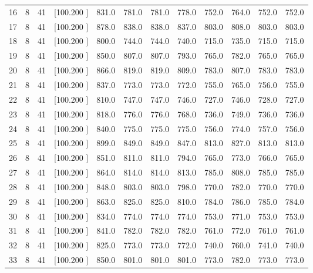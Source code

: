 \documentclass[12pt,a4paper]{article}
\begin{document}
\begin{center}
{\begin{tabular}{r r r r r r r r r r r r}
  16&  8& 41&[100.200   ]&   831.0&   781.0&   781.0&   778.0&   752.0&   764.0&   752.0&   752.0\\[-0.02in]
  17&  8& 41&[100.200   ]&   878.0&   838.0&   838.0&   837.0&   803.0&   808.0&   803.0&   803.0\\[-0.02in]
  18&  8& 41&[100.200   ]&   800.0&   744.0&   744.0&   740.0&   715.0&   735.0&   715.0&   715.0\\[-0.02in]
  19&  8& 41&[100.200   ]&   850.0&   807.0&   807.0&   793.0&   765.0&   782.0&   765.0&   765.0\\[-0.02in]
  20&  8& 41&[100.200   ]&   866.0&   819.0&   819.0&   809.0&   783.0&   807.0&   783.0&   783.0\\[-0.02in]
  21&  8& 41&[100.200   ]&   837.0&   773.0&   773.0&   772.0&   755.0&   765.0&   756.0&   755.0\\[-0.02in]
  22&  8& 41&[100.200   ]&   810.0&   747.0&   747.0&   746.0&   727.0&   746.0&   728.0&   727.0\\[-0.02in]
  23&  8& 41&[100.200   ]&   818.0&   776.0&   776.0&   768.0&   736.0&   749.0&   736.0&   736.0\\[-0.02in]
  24&  8& 41&[100.200   ]&   840.0&   775.0&   775.0&   775.0&   756.0&   774.0&   757.0&   756.0\\[-0.02in]
  25&  8& 41&[100.200   ]&   899.0&   849.0&   849.0&   847.0&   813.0&   827.0&   813.0&   813.0\\[-0.02in]
  26&  8& 41&[100.200   ]&   851.0&   811.0&   811.0&   794.0&   765.0&   773.0&   766.0&   765.0\\[-0.02in]
  27&  8& 41&[100.200   ]&   864.0&   814.0&   814.0&   813.0&   785.0&   808.0&   785.0&   785.0\\[-0.02in]
  28&  8& 41&[100.200   ]&   848.0&   803.0&   803.0&   798.0&   770.0&   782.0&   770.0&   770.0\\[-0.02in]
  29&  8& 41&[100.200   ]&   863.0&   825.0&   825.0&   810.0&   784.0&   786.0&   785.0&   784.0\\[-0.02in]
  30&  8& 41&[100.200   ]&   834.0&   774.0&   774.0&   774.0&   753.0&   771.0&   753.0&   753.0\\[-0.02in]
  31&  8& 41&[100.200   ]&   841.0&   782.0&   782.0&   782.0&   761.0&   772.0&   761.0&   761.0\\[-0.02in]
  32&  8& 41&[100.200   ]&   825.0&   773.0&   773.0&   772.0&   740.0&   760.0&   741.0&   740.0\\[-0.02in]
  33&  8& 41&[100.200   ]&   850.0&   801.0&   801.0&   801.0&   773.0&   782.0&   773.0&   773.0\\[-0.02in]

\end{tabular}}
\end{center}
\end{document}
